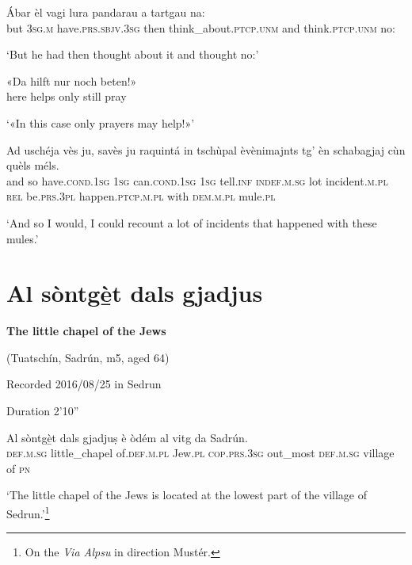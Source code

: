 \begin{linenumbers}
\gll   Ábar èl vagi lura pandarau a tartgau na: \\
but \textsc{3sg.m} have.\textsc{prs.sbjv.3sg} then think\_about.\textsc{ptcp.unm} and think.\textsc{ptcp.unm} no: \\
\end{linenumbers}
\medskip
\glt `But he had then thought about it and thought no:'
\medskip

\begin{linenumbers}
\gll«Da hilft nur noch beten!»\footnotemark\\
here helps only still pray\\
\end{linenumbers}
\medskip
\glt `«In this case only prayers may help!»'
\medskip

\begin{linenumbers}
\gll  Ad uschéja vès ju, savès ju raquintá in tschùpal èvènimajnts tg’ èn schabagjaj cùn quèls méls.  \\
and so have.\textsc{cond.1sg} \textsc{1sg} can.\textsc{cond.1sg} \textsc{1sg} tell.\textsc{inf} \textsc{indef.m.sg} lot incident.\textsc{m.pl} \textsc{rel} be.\textsc{prs.3pl} happen.\textsc{ptcp.m.pl} with \textsc{dem.m.pl} mule.\textsc{pl}\\
\end{linenumbers}
\medskip
\glt `And so I would, I could recount a lot of incidents that happened with these mules.'
\medskip

\section{Al sòntgè̱t dals gjadjus}
\textbf{The little chapel of the Jews}

\noindent
(Tuatschín, Sadrún, m5, aged 64)

\noindent
Recorded 2016/08/25 in Sedrun

\noindent
Duration 2'10''

\bigskip


\begin{linenumbers}
\gll Al sòntgè̱t dals gjadjuṣ è òdém al vitg da Sadrún.\\
 \textsc{def.m.sg} little\_chapel of.\textsc{def.m.pl} Jew.\textsc{pl} \textsc{cop.prs.3sg}  out\_most \textsc{def.m.sg} village of \textsc{pn} \\
\end{linenumbers}
\medskip
\glt `The little chapel of the Jews is located at the lowest part of the village of Sedrun.'\footnote{On the \textit{Via Alpsu} in direction Mustér.}
\medskip


